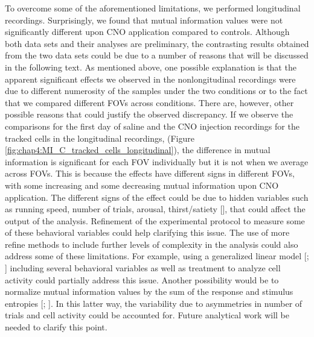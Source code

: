 To overcome some of the aforementioned limitations, we performed longitudinal recordings. 
Surprisingly, we found that mutual information values were not significantly different upon CNO application compared to controls. 
Although both data sets and their analyses are preliminary, the contrasting results obtained from the two data sets could be due to a number of reasons that will be discussed in the following text. 
As mentioned above, one possible explanation is that the apparent significant effects we observed in the nonlongitudinal recordings were due to different numerosity of the samples under the two conditions or to the fact that we compared different FOVs across conditions. 
There are, however, other possible reasons that could justify the observed discrepancy. 
If we observe the comparisons for the first day of saline and the CNO injection recordings for the tracked cells in the longitudinal recordings, (Figure \ref{fig:chap4:MI_C_tracked_cells_longitudinal}), the difference in mutual information is significant for each FOV individually but it is not when we average across FOVs. 
This is because the effects have different signs in different FOVs, with some increasing and some decreasing mutual information upon CNO application.
The different signs of the effect could be due to hidden variables such as running speed, number of trials, arousal, thirst/satiety [\cite{allen2019thirst}], that could affect the output of the analysis. 
Refinement of the experimental protocol to measure some of these behavioral variables could help clarifying this issue.
The use of more refine methods to include further levels of complexity in the analysis could also address some of these limitations.
For example, using a generalized linear model [\cite{saleem2018coherent}; \cite{saleem2013integration}] including several behavioral variables as well as treatment to analyze cell activity could partially address this issue. 
Another possibility would be to normalize mutual information values by the sum of the response and stimulus entropies [\cite{kvaalseth2017normalized}; \cite{timme2018tutorial}]. 
In this latter way, the variability due to asymmetries in number of trials and cell activity could be accounted for.
Future analytical work will be needed to clarify this point.

